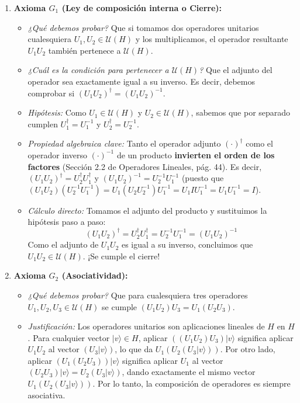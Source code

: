 \documentclass[11pt, a4paper]{article}
\begin{document}
\begin{enumerate}
    \item \textbf{Axioma $G_1$ (Ley de composición interna o Cierre):}
    \begin{itemize}
        \item \textit{¿Qué debemos probar?} Que si tomamos dos operadores unitarios cualesquiera $U_1, U_2 \in \mathcal{U}(H)$ y los multiplicamos, el operador resultante $U_1 U_2$ también pertenece a $\mathcal{U}(H)$.
        \item \textit{¿Cuál es la condición para pertenecer a $\mathcal{U}(H)$?} Que el adjunto del operador sea exactamente igual a su inverso. Es decir, debemos comprobar si $(U_1 U_2)^\dagger = (U_1 U_2)^{-1}$.
        \item \textit{Hipótesis:} Como $U_1 \in \mathcal{U}(H)$ y $U_2 \in \mathcal{U}(H)$, sabemos que por separado cumplen $U_1^\dagger = U_1^{-1}$ y $U_2^\dagger = U_2^{-1}$.
        \item \textit{Propiedad algebraica clave:} Tanto el operador adjunto $(\cdot)^\dagger$ como el operador inverso $(\cdot)^{-1}$ de un producto \textbf{invierten el orden de los factores} (Sección 2.2 de Operadores Lineales, pág. 44). Es decir, $(U_1 U_2)^\dagger = U_2^\dagger U_1^\dagger$ y $(U_1 U_2)^{-1} = U_2^{-1} U_1^{-1}$ (puesto que $(U_1 U_2)(U_2^{-1} U_1^{-1}) = U_1 (U_2 U_2^{-1}) U_1^{-1} = U_1 I U_1^{-1} = U_1 U_1^{-1} = I$).
        \item \textit{Cálculo directo:} Tomamos el adjunto del producto y sustituimos la hipótesis paso a paso:
        \[
        (U_1 U_2)^\dagger = U_2^\dagger U_1^\dagger = U_2^{-1} U_1^{-1} = (U_1 U_2)^{-1}
        \]
        Como el adjunto de $U_1 U_2$ es igual a su inverso, concluimos que $U_1 U_2 \in \mathcal{U}(H)$. ¡Se cumple el cierre!
    \end{itemize}

    \item \textbf{Axioma $G_2$ (Asociatividad):}
    \begin{itemize}
        \item \textit{¿Qué debemos probar?} Que para cualesquiera tres operadores $U_1, U_2, U_3 \in \mathcal{U}(H)$ se cumple $(U_1 U_2) U_3 = U_1 (U_2 U_3)$.
        \item \textit{Justificación:} Los operadores unitarios son aplicaciones lineales de $H$ en $H$. Para cualquier vector $|v\rangle \in H$, aplicar $((U_1 U_2) U_3)|v\rangle$ significa aplicar $U_1 U_2$ al vector $(U_3|v\rangle)$, lo que da $U_1(U_2(U_3|v\rangle))$. Por otro lado, aplicar $(U_1(U_2 U_3))|v\rangle$ significa aplicar $U_1$ al vector $(U_2 U_3)|v\rangle = U_2(U_3|v\rangle)$, dando exactamente el mismo vector $U_1(U_2(U_3|v\rangle))$. Por lo tanto, la composición de operadores es siempre asociativa.
    \end{itemize}


\end{enumerate}
\end{document}
